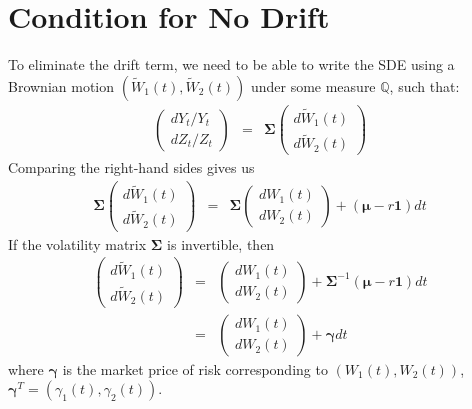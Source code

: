 \documentclass[uplatex,a4j,12pt,dvipdfmx]{jsarticle}
\begin{document}
\section{Condition for No Drift}
To eliminate the drift term, we need to be able to write the SDE using a Brownian motion
$(\tilde{W}_{1}(t),\tilde{W}_{2}(t))$
under some measure $\mathbb{Q}$, such that:
%
%
\begin{eqnarray}
	\left(
	\begin{array}{c}
			d Y_{t} / Y_{t}
			\\
			d Z_{t} / Z_{t}
		\end{array}
	\right)
	&=&
	{\bm \Sigma}
	\left(
	\begin{array}{c}
			d \tilde{W}_{1}(t)
			\\
			d \tilde{W}_{2}(t)
		\end{array}
	\right)
\end{eqnarray}
%
%
Comparing the right-hand sides gives us
%
%
\begin{eqnarray}
	{\bm \Sigma}
	\left(
	\begin{array}{c}
			d \tilde{W}_{1}(t)
			\\
			d \tilde{W}_{2}(t)
		\end{array}
	\right)
	&=&
	{\bm \Sigma}
	\left(
	\begin{array}{c}
			dW_{1}(t)
			\\
			dW_{2}(t)
		\end{array}
	\right)
	+
	( {\bm \mu} - r {\bm 1} ) dt
\end{eqnarray}
%
%
If the volatility matrix ${\bm \Sigma}$ is invertible, then
%
%
\begin{eqnarray}
	\left(
	\begin{array}{c}
			d \tilde{W}_{1}(t)
			\\
			d \tilde{W}_{2}(t)
		\end{array}
	\right)
	&=&
	\left(
	\begin{array}{c}
			dW_{1}(t)
			\\
			dW_{2}(t)
		\end{array}
	\right)
	+
	{\bm \Sigma}^{-1}
	( {\bm \mu} - r {\bm 1} ) dt
	\\ &=&
	\left(
	\begin{array}{c}
			dW_{1}(t)
			\\
			dW_{2}(t)
		\end{array}
	\right)
	+
	{\bm \gamma}dt
\end{eqnarray}
%
%
where ${\bm \gamma}$ is
the market price of risk
corresponding to
$(W_{1}(t),W_{2}(t))$,
${\bm \gamma}^{T} = (\gamma_{1}(t),\gamma_{2}(t))$.
\end{document}
